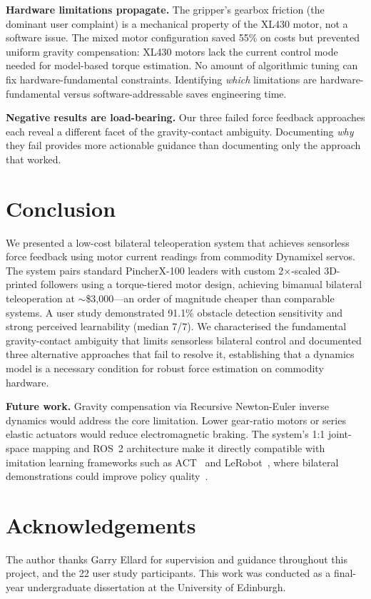 \documentclass[conference]{IEEEtran}
\begin{document}
\textbf{Hardware limitations propagate.} The gripper's gearbox friction (the dominant user complaint) is a mechanical property of the XL430 motor, not a software issue. The mixed motor configuration saved 55\% on costs but prevented uniform gravity compensation: XL430 motors lack the current control mode needed for model-based torque estimation. No amount of algorithmic tuning can fix hardware-fundamental constraints. Identifying \emph{which} limitations are hardware-fundamental versus software-addressable saves engineering time.

\textbf{Negative results are load-bearing.} Our three failed force feedback approaches each reveal a different facet of the gravity-contact ambiguity. Documenting \emph{why} they fail provides more actionable guidance than documenting only the approach that worked.

\section{Conclusion}

We presented a low-cost bilateral teleoperation system that achieves sensorless force feedback using motor current readings from commodity Dynamixel servos. The system pairs standard PincherX-100 leaders with custom 2$\times$-scaled 3D-printed followers using a torque-tiered motor design, achieving bimanual bilateral teleoperation at $\sim$\$3,000---an order of magnitude cheaper than comparable systems. A user study demonstrated 91.1\% obstacle detection sensitivity and strong perceived learnability (median 7/7). We characterised the fundamental gravity-contact ambiguity that limits sensorless bilateral control and documented three alternative approaches that fail to resolve it, establishing that a dynamics model is a necessary condition for robust force estimation on commodity hardware.

\textbf{Future work.} Gravity compensation via Recursive Newton-Euler inverse dynamics would address the core limitation. Lower gear-ratio motors or series elastic actuators would reduce electromagnetic braking. The system's 1:1 joint-space mapping and ROS~2 architecture make it directly compatible with imitation learning frameworks such as ACT~\cite{zhao2023aloha} and LeRobot~\cite{lerobot2025}, where bilateral demonstrations could improve policy quality~\cite{kobayashi2024}.

\section*{Acknowledgements}
The author thanks Garry Ellard for supervision and guidance throughout this project, and the 22 user study participants. This work was conducted as a final-year undergraduate dissertation at the University of Edinburgh.



\end{document}
